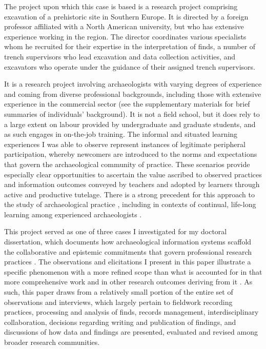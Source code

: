 \documentclass{article}
\begin{document}
The project upon which this case is based is a research project
comprising excavation of a prehistoric site in Southern Europe. It is
directed by a foreign professor affiliated with a North American
university, but who has extensive experience working in the region. The
director coordinates various specialists whom he recruited for their
expertise in the interpretation of finds, a number of trench supervisors
who lead excavation and data collection activities, and excavators who
operate under the guidance of their assigned trench supervisors.

It is a research project involving archaeologists with varying degrees
of experience and coming from diverse professional backgrounds,
including those with extensive experience in the commercial sector (see
the supplementary materials for brief summaries of individuals'
background). It is not a field school, but it does rely to a large
extent on labour provided by undergraduate and graduate students, and as
such engages in on-the-job training. The informal and situated learning
experiences I was able to observe represent instances of legitimate
peripheral participation, whereby newcomers are introduced to the norms
and expectations that govern the archaeological community of practice.
These scenarios provide especially clear opportunities to ascertain the
value ascribed to observed practices and information outcomes conveyed
by teachers and adopted by learners through active and productive
tutelage. There is a strong precedent for this approach to the study of
archaeological practice
\parencites[cf.][]{everill2007,goodwin1994,goodwin2010,morgan2018},
including in contexts of continual, life-long learning among experienced
archaeologists \parencites[cf.][]{edgeworth1991,gero1994,graham2019}.

This project served as one of three cases I investigated for my doctoral
dissertation, which documents how archaeological information systems
scaffold the collaborative and epistemic commitments that govern
professional research practices \parencite{batist2023a}. The observations
and elicitations I present in this paper illustrate a specific
phenomenon with a more refined scope than what is accounted for in that
more comprehensive work and in other research outcomes deriving from it
\parencites[cf.][]{batist2021}{batist2024a}{batist-alienation}. As such,
this paper draws from a relatively small portion of the entire set of
observations and interviews, which largely pertain to fieldwork
recording practices, processing and analysis of finds, records
management, interdisciplinary collaboration, decisions regarding writing
and publication of findings, and discussions of how data and findings
are presented, evaluated and revised among broader research communities.
\end{document}
